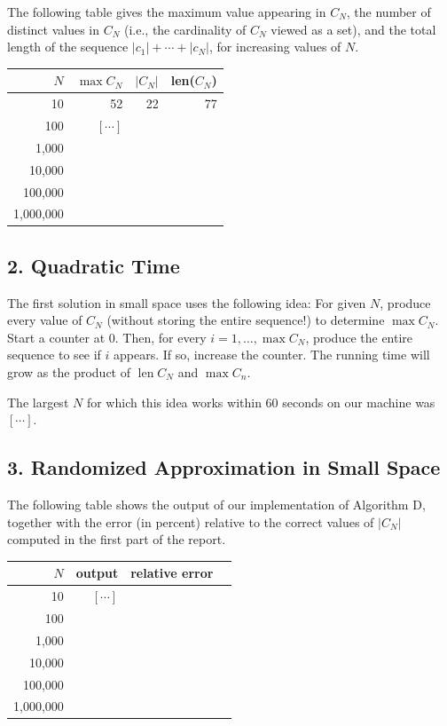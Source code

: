 \documentclass{tufte-handout}
\begin{document}
The following table gives the maximum value appearing in $C_N$, the number
of distinct values in $C_N$ (i.e., the cardinality of $C_N$ viewed as
a set), and the total length of the sequence $|c_1|+\cdots+|c_N|$,
for increasing values of $N$.

\medskip
\begin{tabular}{rrrr}
  \toprule
  $N$ & $\max C_N$ & $|C_N|$ & len($C_N$) \\
  \midrule
  10 & 52 & 22 & 77 
  \\
  100 & $[\cdots]$ \\
  1,000 & \\
  10,000 & \\
  100,000 & \\
  1,000,000 & \\
  \bottomrule
\end{tabular}


\subsection{2. Quadratic Time}

The first solution in small space uses the following idea: For given
$N$, produce every value of $C_N$ (without storing the entire
sequence!)
to determine $\max C_N$.
Start a counter at 0.
Then, for every $i=1,\ldots, \max C_N$, produce the entire sequence to
see if $i$ appears.
If so, increase the counter.
The running time will grow as the product of $\operatorname{len}C_N$ and $ \max C_n$.

The largest $N$ for which this idea works within 60 seconds on our
machine was $[\cdots]$.


\subsection{3. Randomized Approximation in Small Space}

The following table shows the output of our implementation of
Algorithm D, together with the error (in percent) relative to the
correct values of $|C_N|$ computed in the first part of the report.

\medskip
\begin{tabular}{rrrr}
  \toprule
  $N$ &   output & relative error \\
  \midrule
  10 & $[\cdots]$ &
  \\
  100 & \\
  1,000 & \\
  10,000 & \\
  100,000 & \\
  1,000,000 & \\
  \bottomrule
\end{tabular}
\end{document}
